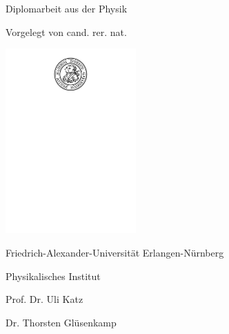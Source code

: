 

%
%
%

\makeatletter
\begin{titlepage}
  \begin{center}
  \begin{otherlanguage}{ngerman}

    \LARGE \@title

    \vspace{1cm}

    \large

    Diplomarbeit aus der Physik \medskip

    Vorgelegt von cand. rer. nat. \\ \@author \medskip

    \@date

    \vspace{1cm}
    \includegraphics[width=5cm, decodearray={0.2 0.5}]{img/fau-siegel-schwarz}
    \vspace{1cm}

    Friedrich-Alexander-Universität Erlangen-Nürnberg \medskip

    Physikalisches Institut \medskip

    Prof. Dr. Uli Katz \medskip

    Dr. Thorsten Glüsenkamp



  \end{otherlanguage}
  \end{center}
\end{titlepage}
\makeatother



